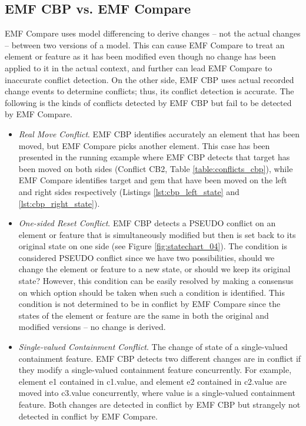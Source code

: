 \subsection{EMF CBP vs. EMF Compare}
\label{sec:emf_cbp_vs_emf_compare}
EMF Compare uses model differencing to derive changes -- not the actual changes -- between two versions of a model. This can cause EMF Compare to treat an element or feature as it has been modified even though no change has been applied to it in the actual context, and further can lead EMF Compare to inaccurate conflict detection. On the other side, EMF CBP uses actual recorded change events to determine conflicts; thus, its conflict detection is accurate. The following is the kinds of conflicts detected by EMF CBP but fail to be detected by EMF Compare. 
\begin{itemize}

\item \emph{Real Move Conflict}. EMF CBP identifies accurately an element that has been moved, but EMF Compare picks another element. This case has been presented in the running example where EMF CBP detects that \textsf{target} has been moved on both sides (Conflict CB2, Table \ref{table:conflicts_cbp}), while EMF Compare identifies \textsf{target} and \textsf{gem} that have been moved on the left and right sides respectively (Listings \ref{lst:cbp_left_state} and \ref{lst:cbp_right_state}).

\item \emph{One-sided Reset Conflict}. EMF CBP detects a \textsf{PSEUDO} conflict on an element or feature that is simultaneously modified but then is set back to its original state on one side (see Figure \ref{fig:statechart_04}). The condition is considered \textsf{PSEUDO} conflict since we have two possibilities, should we change the element or feature to a new state, or should we keep its original state? However, this condition can be easily resolved by making a consensus on which option should be taken when such a condition is identified. This condition is not determined to be in conflict by EMF Compare since the states of the element or feature are the same in both the original and modified versions -- no change is derived.    

\item \emph{Single-valued Containment Conflict}. The change of state of a single-valued containment feature. EMF CBP detects two different changes are in conflict if they modify a single-valued containment feature concurrently. For example, element \textsf{e1} contained in \textsf{c1}.\textsf{value}, and element \textsf{e2} contained in \textsf{c2}.\textsf{value} are moved into \textsf{c3}.\textsf{value} concurrently, where \textsf{value} is a single-valued containment feature. Both changes are detected in conflict by EMF CBP but strangely not detected in conflict by EMF Compare.
\end{itemize}

